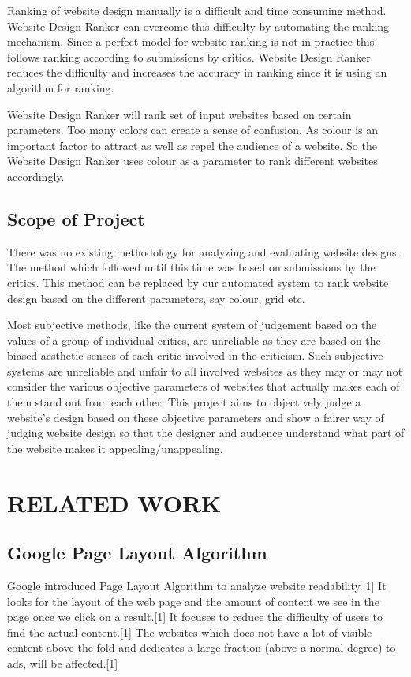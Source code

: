 \documentclass{fisatproject}
\begin{document}
Ranking of website design manually is a difficult and time consuming method. Website Design Ranker can overcome this difficulty by automating the ranking mechanism. Since a perfect model for website ranking is not in practice this follows ranking according to submissions by critics. Website Design Ranker reduces the difficulty and increases the accuracy in ranking since it is using an algorithm for ranking.

Website Design Ranker will rank set of input websites based on certain parameters. Too many colors can create a sense of confusion. As colour is an important factor to attract as well as repel the audience of a website. So the Website Design Ranker uses colour as a parameter to rank different websites accordingly.
\section{Scope of Project}
There was no existing methodology for analyzing and evaluating website designs. The method which followed until this time was based on submissions by the critics. This method can be replaced by our automated system to rank website design based on the different parameters, say colour, grid etc.

Most subjective methods, like the current system of judgement based on the values of a group of individual critics, are unreliable as they are based on the biased aesthetic senses of each critic involved in the criticism. Such subjective systems are unreliable and unfair to all involved websites as they may or may not consider the various objective parameters of websites that actually makes each of them stand out from each other. This project aims to objectively judge a website's design based on these objective parameters and show a fairer way of judging website design so that the designer and audience understand what part of the website makes it appealing/unappealing.
\chapter{RELATED WORK}
\section{Google Page Layout Algorithm}
Google introduced Page Layout Algorithm to analyze website
readability.[1] It looks for the layout of the web page and the amount of
content we see in the page once we click on a result.[1] It focuses to reduce the difficulty of users to find the actual
content.[1]
The websites which does not have a lot of visible content
above-the-fold and dedicates a large fraction (above a normal
degree) to ads, will be affected.[1]
\end{document}

